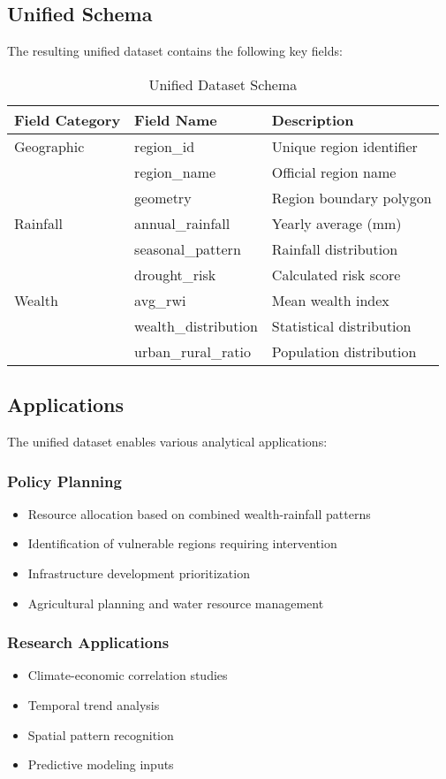 \documentclass[12pt,a4paper]{article}
\begin{document}
\subsection{Unified Schema}
The resulting unified dataset contains the following key fields:
\begin{table}[H]
\centering
\begin{tabular}{@{}lll@{}}
\toprule
\textbf{Field Category} & \textbf{Field Name} & \textbf{Description} \\
\midrule
Geographic & region\_id & Unique region identifier \\
 & region\_name & Official region name \\
 & geometry & Region boundary polygon \\
\midrule
Rainfall & annual\_rainfall & Yearly average (mm) \\
 & seasonal\_pattern & Rainfall distribution \\
 & drought\_risk & Calculated risk score \\
\midrule
Wealth & avg\_rwi & Mean wealth index \\
 & wealth\_distribution & Statistical distribution \\
 & urban\_rural\_ratio & Population distribution \\
\bottomrule
\end{tabular}
\caption{Unified Dataset Schema}
\label{tab:unified-schema}
\end{table}

\subsection{Applications}
The unified dataset enables various analytical applications:

\subsubsection{Policy Planning}
\begin{itemize}
    \item Resource allocation based on combined wealth-rainfall patterns
    \item Identification of vulnerable regions requiring intervention
    \item Infrastructure development prioritization
    \item Agricultural planning and water resource management
\end{itemize}

\subsubsection{Research Applications}
\begin{itemize}
    \item Climate-economic correlation studies
    \item Temporal trend analysis
    \item Spatial pattern recognition
    \item Predictive modeling inputs
\end{itemize}
\end{document}
